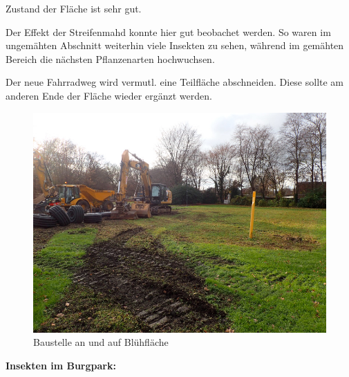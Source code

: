 \documentclass[10pt]{article}
\begin{document}
\begin{flushleft}
Zustand der Fläche ist sehr gut.

Der Effekt der Streifenmahd konnte hier gut beobachet werden.
So waren im ungemähten Abschnitt weiterhin viele Insekten zu sehen, während im gemähten Bereich die nächsten Pflanzenarten hochwuchsen.

Der neue Fahrradweg wird vermutl. eine Teilfläche abschneiden. 
Diese sollte am anderen Ende der Fläche wieder ergänzt werden.


\begin{figure}[h!]
  \centering
  \includegraphics[width=0.45\linewidth]{img/burgpark/baustelle.jpg}
  \caption{Baustelle an und auf Blühfläche}
  \label{fig:boat1}
\end{figure}

\end{flushleft}

\newpage

\textbf{Insekten im Burgpark:}
\end{document}
